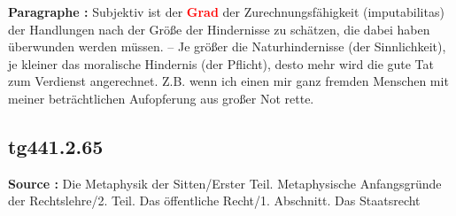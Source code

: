 \documentclass[a4paper,12pt,twoside]{book}
\newcommand{\match}[1]{\textcolor{red}{\textbf{#1}}}
\begin{document}
	\textbf{Paragraphe : }
	Subjektiv ist der \match{Grad} der Zurechnungsfähigkeit (imputabilitas) der Handlungen nach der Größe der Hindernisse zu schätzen, die dabei haben überwunden werden müssen. – Je größer die Naturhindernisse (der Sinnlichkeit), je kleiner das moralische Hindernis (der Pflicht), desto mehr wird die gute Tat zum Verdienst angerechnet. Z.B. wenn ich einen mir ganz fremden Menschen mit meiner beträchtlichen Aufopferung aus großer Not rette. 
	
	\subsection*{tg441.2.65} 
	\textbf{Source : }Die Metaphysik der Sitten/Erster Teil. Metaphysische Anfangsgründe der Rechtslehre/2. Teil. Das öffentliche Recht/1. Abschnitt. Das Staatsrecht\\  
	
\end{document}
